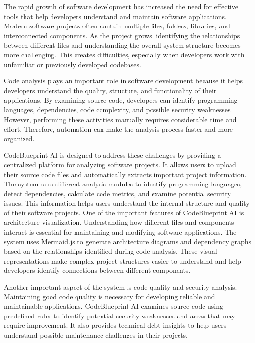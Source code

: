 \documentclass[0pt, a4 paper]{report}
\begin{document}
\begin{center}
{\vspace{1cm}

\justify The rapid growth of software development has increased the need for effective tools that help developers understand and maintain software applications. Modern software projects often contain multiple files, folders, libraries, and interconnected components. As the project grows, identifying the relationships between different files and understanding the overall system structure becomes more challenging. This creates difficulties, especially when developers work with unfamiliar or previously developed codebases.

\justify Code analysis plays an important role in software development because it helps developers understand the quality, structure, and functionality of their applications. By examining source code, developers can identify programming languages, dependencies, code complexity, and possible security weaknesses. However, performing these activities manually requires considerable time and effort. Therefore, automation can make the analysis process faster and more organized.

\justify CodeBlueprint AI is designed to address these challenges by providing a centralized platform for analyzing software projects. It allows users to upload their source code files and automatically extracts important project information. The system uses different analysis modules to identify programming languages, detect dependencies, calculate code metrics, and examine potential security issues. This information helps users understand the internal structure and quality of their software projects. One of the important features of CodeBlueprint AI is architecture visualization. Understanding how different files and components interact is essential for maintaining and modifying software applications. The system uses Mermaid.js to generate architecture diagrams and dependency graphs based on the relationships identified during code analysis. These visual representations make complex project structures easier to understand and help developers identify connections between different components. 

\justify Another important aspect of the system is code quality and security analysis. Maintaining good code quality is necessary for developing reliable and maintainable applications. CodeBlueprint AI examines source code using predefined rules to identify potential security weaknesses and areas that may require improvement. It also provides technical debt insights to help users understand possible maintenance challenges in their projects.


}
\end{center}
\end{document}
